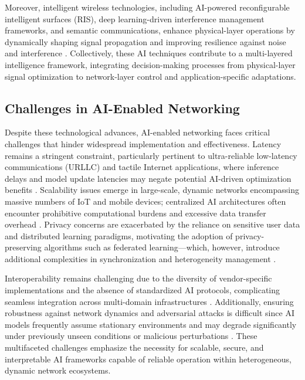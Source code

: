 \documentclass[sigconf]{acmart}
\begin{document}
Moreover, intelligent wireless technologies, including AI-powered reconfigurable intelligent surfaces (RIS), deep learning-driven interference management frameworks, and semantic communications, enhance physical-layer operations by dynamically shaping signal propagation and improving resilience against noise and interference \cite{ref16,ref49,ref50}. Collectively, these AI techniques contribute to a multi-layered intelligence framework, integrating decision-making processes from physical-layer signal optimization to network-layer control and application-specific adaptations.

\subsection{Challenges in AI-Enabled Networking}

Despite these technological advances, AI-enabled networking faces critical challenges that hinder widespread implementation and effectiveness. Latency remains a stringent constraint, particularly pertinent to ultra-reliable low-latency communications (URLLC) and tactile Internet applications, where inference delays and model update latencies may negate potential AI-driven optimization benefits \cite{ref26,ref27}. Scalability issues emerge in large-scale, dynamic networks encompassing massive numbers of IoT and mobile devices; centralized AI architectures often encounter prohibitive computational burdens and excessive data transfer overhead \cite{ref28}. Privacy concerns are exacerbated by the reliance on sensitive user data and distributed learning paradigms, motivating the adoption of privacy-preserving algorithms such as federated learning—which, however, introduce additional complexities in synchronization and heterogeneity management \cite{ref29,ref52}. 

Interoperability remains challenging due to the diversity of vendor-specific implementations and the absence of standardized AI protocols, complicating seamless integration across multi-domain infrastructures \cite{ref30,ref48}. Additionally, ensuring robustness against network dynamics and adversarial attacks is difficult since AI models frequently assume stationary environments and may degrade significantly under previously unseen conditions or malicious perturbations \cite{ref49,ref50,ref53}. These multifaceted challenges emphasize the necessity for scalable, secure, and interpretable AI frameworks capable of reliable operation within heterogeneous, dynamic network ecosystems.
\end{document}
